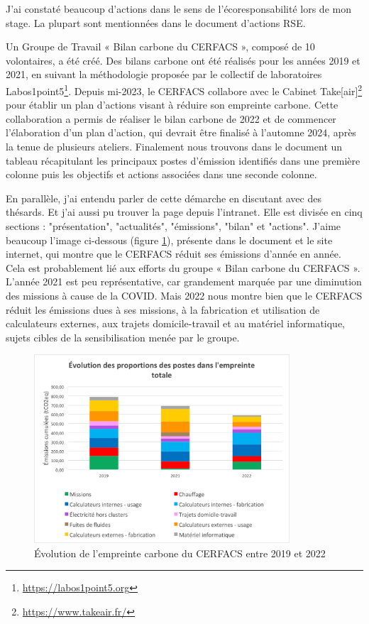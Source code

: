     J'ai constaté beaucoup d'actions dans le sens de l'écoresponsabilité lors de mon stage. La plupart sont mentionnées dans le document d'actions RSE.

    Un Groupe de Travail « Bilan carbone du CERFACS », composé de 10 volontaires, a été créé. Des bilans carbone ont été réalisés pour les années 2019 et 2021, en suivant la méthodologie proposée par le collectif de laboratoires Labos1point5\footnote{\url{https://labos1point5.org}}. Depuis mi-2023, le CERFACS collabore avec le Cabinet Take[air]\footnote{\url{https://www.takeair.fr/}} pour établir un plan d’actions visant à réduire son empreinte carbone. Cette collaboration a permis de réaliser le bilan carbone de 2022 et de commencer l'élaboration d'un plan d'action, qui devrait être finalisé à l’automne 2024, après la tenue de plusieurs ateliers. Finalement nous trouvons dans le document un tableau  récapitulant les principaux postes d'émission identifiés dans une première colonne puis les objectifs et actions associées dans une seconde colonne.

    En parallèle, j'ai entendu parler de cette démarche en discutant avec des thésards. Et j'ai aussi pu trouver la page depuis l'intranet. Elle est divisée en cinq sections : "présentation", "actualités", "émissions", "bilan" et "actions".
    J'aime beaucoup l'image ci-dessous (figure \ref{fig:evolution_empreinte_carbone}), présente dans le document et le site internet, qui montre que le CERFACS réduit ses émissions d'année en année. Cela est probablement lié aux efforts du groupe « Bilan carbone du CERFACS ». L'année 2021 est peu représentative, car grandement marquée par une diminution des missions à cause de la COVID. Mais 2022 nous montre bien que le CERFACS réduit les émissions dues à ses missions, à la fabrication et utilisation de calculateurs externes, aux trajets domicile-travail et au matériel informatique, sujets cibles de la sensibilisation menée par le groupe.

    \begin{figure}[H]
        \centering
        \includegraphics[width=0.85\textwidth]{images/evolution_postes_empreintecarbone.png}
        \caption{Évolution de l'empreinte carbone du CERFACS entre 2019 et 2022}
        \label{fig:evolution_empreinte_carbone}
    \end{figure}

